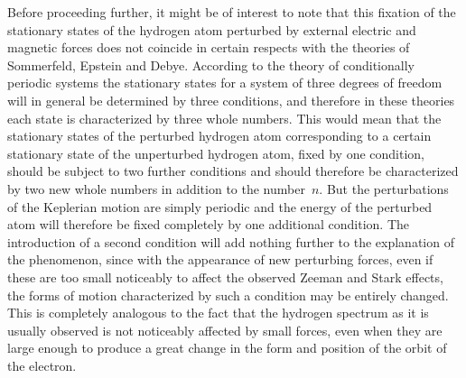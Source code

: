 Before proceeding further, it might be of interest to note that
this fixation of the stationary states of the hydrogen atom perturbed
by external electric and magnetic forces does not coincide in certain
respects with the theories of Sommerfeld, Epstein and Debye.
According to the theory of conditionally periodic systems the stationary
states for a system of three degrees of freedom will in general
be determined by three conditions, and therefore in these theories
each state is characterized by three whole numbers. This would
mean that the stationary states of the perturbed hydrogen atom
corresponding to a certain stationary state of the unperturbed
hydrogen atom, fixed by one condition, should be subject to two
further conditions and should therefore be characterized by two
new whole numbers in addition to the number~$n$. But the perturbations
of the Keplerian motion are simply periodic and the
energy of the perturbed atom will therefore be fixed completely
by one additional condition. The introduction of a second condition
will add nothing further to the explanation of the phenomenon,
since with the appearance of new perturbing forces, even if
these are too small noticeably to affect the observed Zeeman and
Stark effects, the forms of motion characterized by such a condition
may be entirely changed. This is completely analogous to the
fact that the hydrogen spectrum as it is usually observed is not
noticeably affected by small forces, even when they are large enough
to produce a great change in the form and position of the orbit of
the electron.

